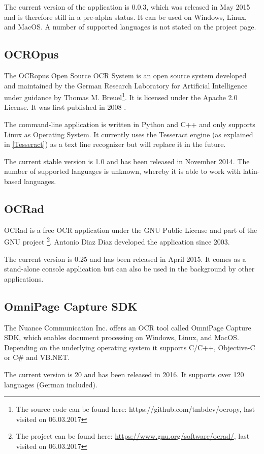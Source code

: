 The current version of the application is 0.0.3, which was released in May 2015 and is therefore still in a pre-alpha status. It can be used on Windows, Linux, and MacOS. A number of supported languages is not stated on the project page.

\subsection{OCROpus}
\label{sec3.1.7}
The OCRopus Open Source OCR System is an open source system developed and maintained by the German Research Laboratory for Artificial Intelligence under guidance by Thomas M. Breuel\footnote{The source code can be found here: https://github.com/tmbdev/ocropy, last visited on 06.03.2017}. It is licensed under the Apache 2.0 License. It was first published in 2008 \cite{Breuel08}.

The command-line application is written in Python and C++ and only supports Linux as Operating System. It currently uses the Tesseract engine (as explained in \ref{Tesseract}) as a text line recognizer but will replace it in the future. 

The current stable version is 1.0 and has been released in November 2014. The number of supported languages is unknown, whereby it is able to work with latin-based languages.

\label{OCRad}
\subsection{OCRad}
OCRad is a free OCR application under the GNU Public License and part of the GNU project \footnote{The project can be found here: \url{https://www.gnu.org/software/ocrad/}, last visited on 06.03.2017}. Antonio Diaz Diaz developed the application since 2003.

The current version is 0.25 and has been released in April 2015. It comes as a stand-alone console application but can also be used in the background by other applications.

\label{OmniPage}
\subsection{OmniPage Capture SDK}
The Nuance Communication Inc. offers an OCR tool called OmniPage Capture SDK, which enables document processing on Windows, Linux, and MacOS. Depending on the underlying operating system it supports C/C++, Objective-C or C\# and VB.NET.

The current version is 20 and has been released in 2016. It supports over 120 languages (German included).


